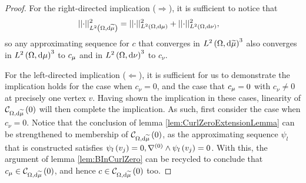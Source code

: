 \begin{proof}
	For the right-directed implication ($\Rightarrow$), it is sufficient to notice that 
	\begin{align*}
		\lvert\lvert \cdot \rvert\rvert_{L^{2}\left( \Omega,\mathrm{d}\widetilde{\mu} \right)}^2 &= \lvert\lvert \cdot \rvert\rvert_{L^{2}\left( \Omega,\mathrm{d}\mu \right)}^2 + \lvert\lvert \cdot \rvert\rvert_{L^{2}\left( \Omega,\mathrm{d}\nu \right)}^2,
	\end{align*}
	so any approximating sequence for $c$ that converges in $L^{2}\left( \Omega,\mathrm{d}\widetilde{\mu} \right)^3$ also converges in $L^{2}\left( \Omega,\mathrm{d}\mu \right)^3$ to $c_{\mu}$ and in $L^{2}\left( \Omega,\mathrm{d}\nu \right)^3$ to $c_{\nu}$.
	
	For the left-directed implication ($\Leftarrow$), it is sufficient for us to demonstrate the implication holds for the case when $c_{\nu}=0$, and the case that $c_{\mu}=0$ with $c_{\nu}\neq0$ at precisely one vertex $v$.
	Having shown the implication in these cases, linearity of $\mathcal{C}_{ \Omega, \mathrm{d}\widetilde{\mu}}\left( 0 \right)$ will then complete the implication.
	As such, first consider the case when $c_{\nu}=0$.
	Notice that the conclusion of lemma \ref{lem:CurlZeroExtensionLemma} can be strengthened to membership of $\mathcal{C}_{ \Omega, \mathrm{d}\widetilde{\mu}}\left( 0 \right)$, as the approximating sequence $\psi_l$ that is constructed satisfies $\psi_l\left( v_j \right)=0, \nabla^{(0)}\wedge\psi_l\left( v_j \right)=0$.
	With this, the argument of lemma \ref{lem:BInCurlZero} can be recycled to conclude that $c_{\mu}\in\mathcal{C}_{ \Omega, \mathrm{d}\widetilde{\mu}}\left( 0 \right)$, and hence $c\in\mathcal{C}_{ \Omega, \mathrm{d}\widetilde{\mu}}\left( 0 \right)$ too.
	

\end{proof}
